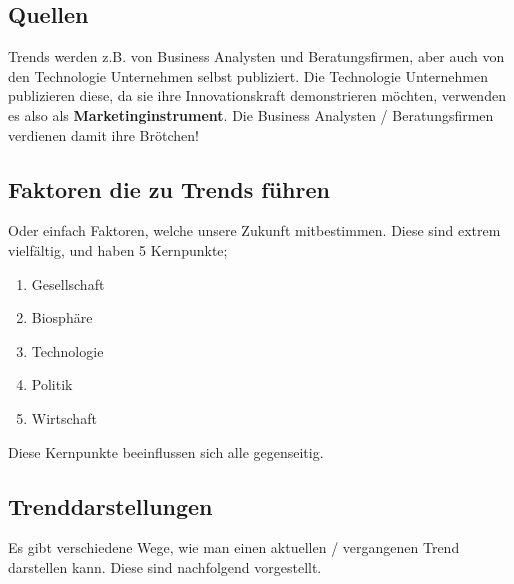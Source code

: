\subsection{Quellen}
Trends werden z.B. von Business Analysten und Beratungsfirmen, aber auch von den Technologie Unternehmen selbst publiziert. Die Technologie Unternehmen publizieren diese, da sie ihre Innovationskraft demonstrieren möchten, verwenden es also als \textbf{Marketinginstrument}. Die Business Analysten  / Beratungsfirmen verdienen damit ihre Brötchen!
\subsection{Faktoren die zu Trends führen}
Oder einfach Faktoren, welche unsere Zukunft mitbestimmen. Diese sind extrem vielfältig, und haben 5 Kernpunkte;
\begin{enumerate}
	\item Gesellschaft
	\item Biosphäre
	\item Technologie
	\item Politik
	\item Wirtschaft
\end{enumerate}
Diese Kernpunkte beeinflussen sich alle gegenseitig.
\subsection{Trenddarstellungen}
Es gibt verschiedene Wege, wie man einen aktuellen / vergangenen Trend darstellen kann. Diese sind nachfolgend vorgestellt.
